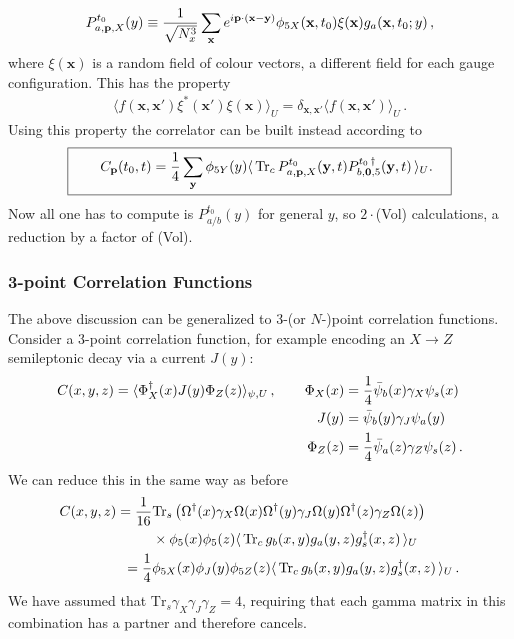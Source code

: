 \begin{align}
  P^{t_0}_{a,{\textbf{p}},X}(y) \equiv {1\over \sqrt{N_x^3}} \sum_{\textbf{x}} e^{i{\textbf{p}}\cdot ({\textbf{x}}-{\textbf{y}})} \phi_{5X}({\textbf{x}},t_0) \xi({\textbf{x}}) g_a({\textbf{x}},t_0;y)\,,
  \label{eq:onesided_prop}
\end{align}
where $\xi({\textbf{x}})$ is a random field of colour vectors, a different field for each gauge configuration. This has the property
\begin{align}
  \langle f({\textbf{x}},{\textbf{x}}') \xi^*({\textbf{x}}')\xi({\textbf{x}})\rangle_U = \delta_{{\textbf{x}},{\textbf{x}}'} \langle f({\textbf{x}},{\textbf{x}}') \rangle_U\,.
\end{align}
Using this property the correlator can be built instead according to
\begin{align}
  \boxed{\quad  \quad C_{\textbf{p}}(t_0,t) = {1\over 4} \sum_{\textbf{y}} \phi_{5Y}(y) \langle \,\text{Tr}_c \, P^{t_0}_{a,{\textbf{p}},X}({\textbf{y}},t) P^{t_0\,\dagger}_{b,{\textbf{0}},5}({\textbf{y}},t) \,\rangle_U. \quad}
  \label{eq:tietogether}
\end{align}
Now all one has to compute is $P^{t_0}_{a/b}(y)$ for general $y$, so $2\cdot$(Vol) calculations, a reduction by a factor of (Vol).

\subsubsection{3-point Correlation Functions}

The above discussion can be generalized to 3-(or $N$-)point correlation functions. Consider a 3-point correlation function, for example encoding an $X\to Z$ semileptonic decay via a current $J(y)$:
\begin{align}
  C(x,y,z) = \langle \Phi^{\dagger}_X(x) J(y) \Phi_Z(z) \rangle_{\psi,U} \,,\quad \quad \Phi_X(x) &= {1\over 4} \bar{\psi}_b(x) \gamma_X \psi_s(x) \\
  \nonumber
  J(y) &= \bar{\psi}_b(y)\gamma_J\psi_a(y) \\
  \nonumber
  \Phi_Z(z) &= {1\over 4}\bar{\psi}_a(z)\gamma_Z \psi_s(z)\,.
\end{align}
We can reduce this in the same way as before
\begin{align}
  C(x,y,z) = {1\over 16}& \text{Tr}_s\left( \Omega^{\dagger}(x) \gamma_X \Omega(x) \Omega^{\dagger}(y) \gamma_J \Omega(y) \Omega^{\dagger}(z) \gamma_Z \Omega(z) \right) \\ \nonumber &\times \phi_5(x)\phi_5(z)\langle \,\text{Tr}_c\, g_{b}(x,y) g_{a}(y,z) g^{\dagger}_{s}(x,z)\,\rangle_U \\
  = {1\over 4}& \phi_{5X}(x) \phi_J(y) \phi_{5Z}(z) \langle \,\text{Tr}_c\, g_{b}(x,y) g_{a}(y,z) g^{\dagger}_{s}(x,z) \,\rangle_U\,.
\end{align}
We have assumed that $\text{Tr}_s \gamma_X\gamma_J\gamma_Z = 4$, requiring that each gamma matrix in this combination has a partner and therefore cancels.

